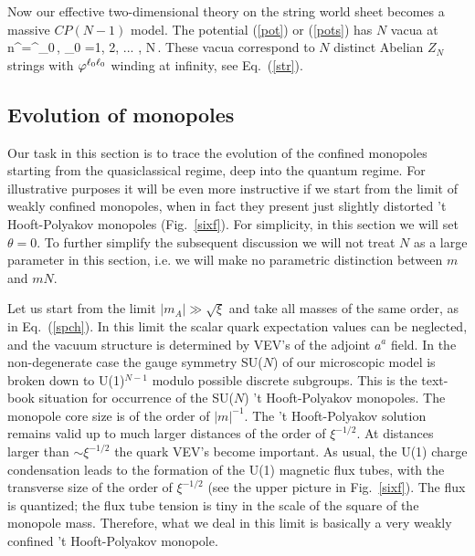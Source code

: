 Now our effective two-dimensional theory on the string world sheet becomes
a massive $CP(N-1)$ model. The potential (\ref{pot}) or (\ref{pots}) has $N$ vacua
at 
\beq
n^\ell=\delta^{\ell\ell_0}\,, \qquad \ell_0 =1, 2, ... , N\,.
\label{nell}
\eeq
These vacua correspond
to $N$ distinct Abelian $Z_N$ strings with $\varphi^{\ell_0 \ell_0}$ winding at 
infinity, see Eq.~(\ref{str}).

\subsection{Evolution of monopoles}
\label{eom}

Our task in this section is to trace the evolution of the confined monopoles
starting from the quasiclassical regime, deep into the quantum regime.
For illustrative purposes it will be even more instructive if we start from the
limit of weakly confined monopoles, when in fact they present
just slightly distorted 't Hooft-Polyakov monopoles (Fig.~\ref{sixf}).
For simplicity, in this section we will set $\theta =0$.
To further simplify the subsequent
discussion  we will 
not treat $N$ as a large parameter in this section, i.e. we will 
make no parametric distinction between $m$ and $mN$.

Let us start from the limit $| m_A| \gg \sqrt{\xi }$ and take all
masses of the same order,  as in Eq.~(\ref{spch}). 
In this limit the scalar quark expectation values can be neglected,
and the vacuum structure is determined by VEV's of the adjoint
$a^a$ field. In the non-degenerate case
the gauge symmetry SU($N$) of our microscopic model
is broken down to U(1)$^{N-1}$ modulo possible discrete subgroups.
This is the text-book situation for occurrence of the
 SU($N$) 't Hooft-Polyakov monopoles. The monopole core size
 is of the order of $| m|^{-1}$. 
The 't Hooft-Polyakov
solution remains valid up to much larger distances of the order
of $\xi^{-1/2}$. At distances larger than $\sim \xi^{-1/2}$  
the quark VEV's become important. As usual, the U(1) 
charge condensation leads
to the formation of the U(1) magnetic flux tubes, with the transverse size
of the order of $\xi^{-1/2}$ (see the upper picture in Fig.~\ref{sixf}).
The flux is quantized; the flux tube tension is tiny in
the  scale of  the square
of the monopole mass. Therefore, what we deal in this limit is
basically a very weakly confined 't Hooft-Polyakov monopole.

